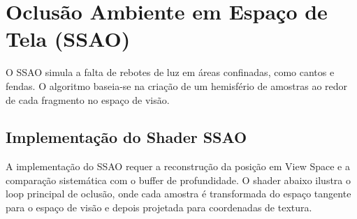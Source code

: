 \section{Oclusão Ambiente em Espaço de Tela (SSAO)}

O SSAO simula a falta de rebotes de luz em áreas confinadas, como cantos e fendas. O algoritmo baseia-se na criação de um hemisfério de amostras ao redor de cada fragmento no espaço de visão.

\subsection{Implementação do Shader SSAO}

A implementação do SSAO requer a reconstrução da posição em View Space e a comparação sistemática com o buffer de profundidade. O shader abaixo ilustra o loop principal de oclusão, onde cada amostra é transformada do espaço tangente para o espaço de visão e depois projetada para coordenadas de textura.

